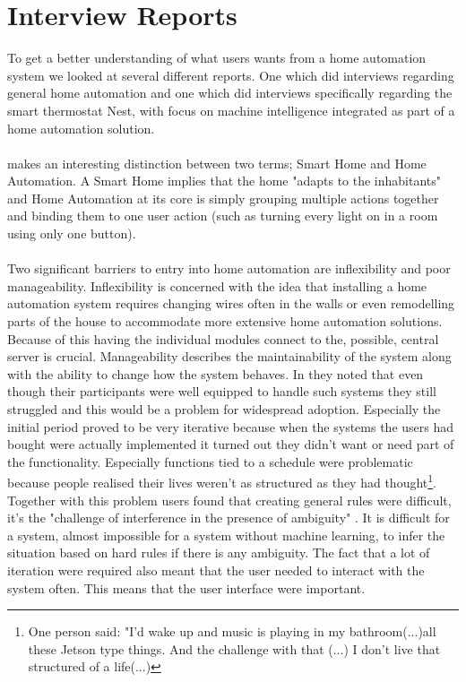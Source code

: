 \section{Interview Reports}
\label{sec:interviewReports}
To get a better understanding of what users wants from a home automation system we looked at several different reports. One \cite{HAInterviews} which did interviews regarding general home automation and one \cite{AdaptiveInterviews} which did interviews specifically regarding the smart thermostat Nest, with focus on machine intelligence integrated as part of a home automation solution. 
\\\\
\cite{HAInterviews} makes an interesting distinction between two terms; Smart Home and Home Automation. A Smart Home implies that the home "adapts to the inhabitants" and Home Automation at its core is simply grouping multiple actions together and binding them to one user action (such as turning every light on in a room using only one button).
\\\\
Two significant barriers to entry into home automation are inflexibility and poor manageability\cite{HAInterviews}. Inflexibility is concerned with the idea that installing a home automation system requires changing wires often in the walls or even remodelling parts of the house to accommodate more extensive home automation solutions.  Because of this having the individual modules connect to the, possible, central server is crucial.
Manageability describes the maintainability of the system along with the ability to change how the system behaves. In \cite{HAInterviews} they noted that even though their participants were well equipped to handle such systems they still struggled and this would be a problem for widespread adoption. Especially the initial period proved to be very iterative because when the systems the users had bought were actually implemented it turned out they didn't want or need part of the functionality. Especially functions tied to a schedule were problematic because people realised their lives weren't as structured as they had thought\footnote{One person said: "I'd wake up and music is playing in my bathroom(...)all these Jetson type things. And the challenge with that (...) I don't live that structured of a life(...)}. Together with this problem users found that creating general rules were difficult, it's the "challenge of interference in the presence of ambiguity" \cite{HAInterviews}. It is difficult for a system, almost impossible for a system without machine learning, to infer the situation based on hard rules if there is any ambiguity. The fact that a lot of iteration were required also meant that the user needed to interact with the system often. This means that the user interface were important.
